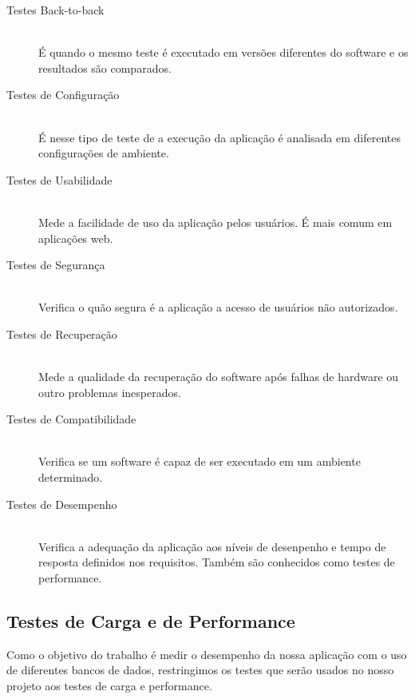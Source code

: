 \begin{description}

\item[Testes Back-to-back] \hfill \\

É quando o mesmo teste é executado em versões diferentes do software e os resultados são comparados.

\item[Testes de Configuração] \hfill \\

É nesse tipo de teste de a execução da aplicação é analisada em diferentes configurações de ambiente.

\item[Testes de Usabilidade] \hfill \\

Mede a facilidade de uso da aplicação pelos usuários. É mais comum em aplicações web.

\item[Testes de Segurança] \hfill \\

Verifica o quão segura é a aplicação a acesso de usuários não autorizados.

\item[Testes de Recuperação] \hfill \\

Mede a qualidade da recuperação do software após falhas de hardware ou outro problemas inesperados.

\item[Testes de Compatibilidade] \hfill \\

Verifica se um software é capaz de ser executado em um ambiente determinado.

\item[Testes de Desempenho] \hfill \\

Verifica a adequação da aplicação aos níveis de desenpenho e tempo de resposta definidos nos requisitos. Também são conhecidos como testes de performance.

\end{description}



\subsection{Testes de Carga e de Performance}

Como o objetivo do trabalho é medir o desempenho da nossa aplicação com o uso de diferentes bancos de dados, restringimos os testes que serão usados no nosso projeto aos testes de carga e performance.

